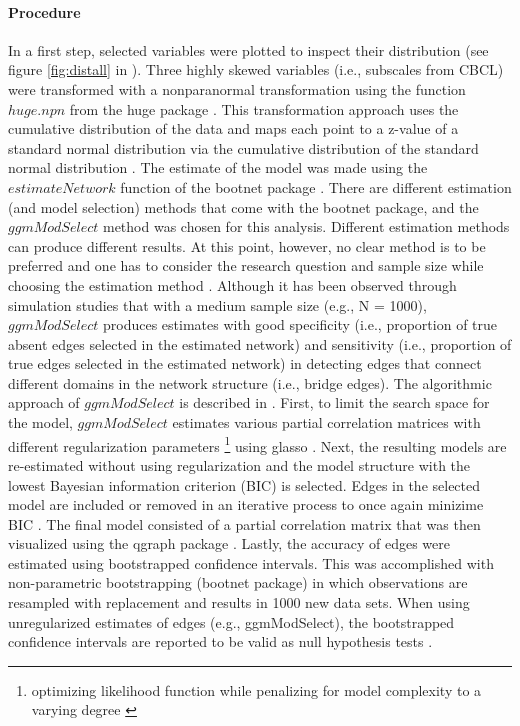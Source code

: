 \paragraph{Procedure}
In a first step, selected variables were plotted to inspect their distribution (see figure \ref{fig:distall} in ). Three highly skewed variables (i.e., subscales from CBCL) were transformed with a nonparanormal transformation \parencite{liuNonparanormalSemiparametricEstimation2009} using the function $huge.npn$ from the huge package \parencite{zhaoHugePackageHighdimensional2012}. This transformation approach uses the cumulative distribution of the data and maps each point to a z-value of a standard normal distribution via the cumulative distribution of the standard normal distribution \parencite{liuNonparanormalSemiparametricEstimation2009}. The estimate of the model was made using the $estimateNetwork$ function of the bootnet package \parencite{epskampPackageBootnet2015}. There are different estimation (and model selection) methods that come with the bootnet package, and the $ggmModSelect$ method was chosen for this analysis. Different estimation methods can produce different results. At this point, however, no clear method is to be preferred and one has to consider the research question and sample size while choosing the estimation method \parencite{isvoranuWhichEstimationMethod2021}. Although it has been observed through simulation studies that with a medium sample size (e.g., N = 1000), $ggmModSelect$ produces estimates with good specificity (i.e., proportion of true absent edges selected in the estimated network) and sensitivity (i.e., proportion of true edges selected in the estimated network) in detecting edges that connect different domains in the network structure (i.e., bridge edges).  
The algorithmic approach of $ggmModSelect$ is described in \textcite{isvoranuNetworkPsychometricsGuide2022}. First, to limit the search space for the model, $ggmModSelect$ estimates various partial correlation matrices with different regularization parameters \footnote{optimizing likelihood function while penalizing for model complexity to a varying degree \parencite{isvoranuNetworkPsychometricsGuide2022}} using glasso \parencite{friedmanSparseInverseCovariance2008}. Next, the resulting models are re-estimated without using regularization and the model structure with the lowest Bayesian information criterion (BIC) is selected. Edges in the selected model are included or removed in an iterative process to once again minizime BIC \parencite{isvoranuNetworkPsychometricsGuide2022}.   
The final model consisted of a partial correlation matrix that was then visualized using the qgraph package \parencite{epskampQgraphNetworkVisualizations2012}. Lastly, the accuracy of edges were estimated using bootstrapped confidence intervals. This was accomplished with non-parametric bootstrapping (bootnet package) in which observations are resampled with replacement and results in 1000 new data sets. When using unregularized estimates of edges (e.g., ggmModSelect), the bootstrapped confidence intervals are reported to be valid as null hypothesis tests \parencite{epskampEstimatingPsychologicalNetworks2018}.
